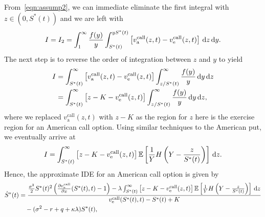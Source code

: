 From~\eqref{eqn:assump2}, we can immediate eliminate the first integral with $z \in (0,S^*(t))$ and we are left with
	$$
		I = I_2 = \int_1^\infty\frac{f(y)}{y} \int_{S^*(t)}^{yS^*(t)} \left[ v_{\text{a}}^{\text{call}}(z,t) -  v_{\text{e}}^{\text{call}}(z,t) \right] \, \mathrm d z\, \mathrm d y.
	$$
The next step is to reverse the order of integration between $z$ and $y$ to yield
	\begin{align*}
		I &= \int_{S^*(t)}^\infty \left[ v_{\text{a}}^{\text{call}}(z,t) -  v_{\text{e}}^{\text{call}}(z,t) \right] \int_{z/S^*(t)}^\infty \frac{f(y)}{y} \, \mathrm d y \, \mathrm d z \\
		&=  \int_{S^*(t)}^\infty \left[  z - K -  v_{\text{e}}^{\text{call}}(z,t) \right] \int_{z/S^*(t)}^\infty \frac{f(y)}{y} \, \mathrm d y \, \mathrm d z,
	\end{align*}
where we replaced $v_{\text{a}}^{\text{call}}(z,t)$ with $z - K$ as the region for $z$ here is the exercise region for an American call option. Using similar techniques to the American put, we eventually arrive at
	$$
		I = \int_{S^*(t)}^\infty \left[ z - K -  v_{\text{e}}^{\text{call}}(z,t) \right] \mathbb E \left[ \frac{1}{Y} H \left( Y - \frac{z}{S^*(t)} \right)\right] \, \mathrm d z.
	$$
Hence, the approximate IDE for an American call option is given by
	\begin{equation}
				\label{eqn:SApproxCall}
				\begin{split}
				\dot{S}^*(t) &= \frac{\frac{\sigma^2}{2}S^*(t)^2\left(\frac{\partial  v_{\text{e}}^{\text{call}} }{\partial x}(S^*(t),t) - 1\right) - \lambda\int_{S^*(t)}^\infty \left[ z - K -  v_{\text{e}}^{\text{call}}(z,t) \right] \mathbb E \left[ \frac{1}{Y} H \left( Y - \frac{z}{S^*(t)} \right)\right] \, \mathrm d z}{  v_{\text{e}}^{\text{call}}(S^*(t),t) - S^*(t) + K} \\
				&\quad{} - (\sigma^2 - r + q +\kappa\lambda)S^*(t),
				\end{split}
			\end{equation}


